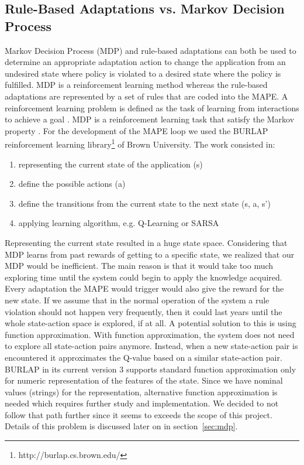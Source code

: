 \documentclass{seal_thesis}
\begin{document}
\subsection{Rule-Based Adaptations vs. Markov Decision Process}

Markov Decision Process (MDP) and rule-based adaptations can both be used to determine an appropriate adaptation action to change the application from an undesired state where policy is violated to a desired state where the policy is fulfilled.
MDP is a reinforcement learning method whereas the rule-based adaptations are represented by a set of rules that are coded into the MAPE.
A reinforcement learning problem is defined as the task of learning from interactions to achieve a goal \cite{sutton1998reinforcement}.
MDP is a reinforcement learning task that satisfy the Markov property \cite{sutton1998reinforcement}.
For the development of the MAPE loop we used the BURLAP reinforcement learning library\footnote{http://burlap.cs.brown.edu/} of Brown University. The work consisted in:
\begin{enumerate}
	\item representing the current state of the application (s)
	\item define the possible actions (a)
	\item define the transitions from the current state to the next state (s, a, s')
	\item applying learning algorithm, e.g. Q-Learning or SARSA
\end{enumerate}
Representing the current state resulted in a huge state space.
Considering that MDP learns from past rewards of getting to a specific state, we realized that our MDP would be inefficient.
The main reason is that it would take too much exploring time until the system could begin to apply the knowledge acquired.
Every adaptation the MAPE would trigger would also give the reward for the new state.
If we assume that in the normal operation of the system a rule violation should not happen very frequently, then it could last years until the whole state-action space is explored, if at all.
A potential solution to this is using function approximation.
With function approximation, the system does not need to explore all state-action pairs anymore.
Instead, when a new state-action pair is encountered it approximates the Q-value based on a similar state-action pair.
BURLAP in its current version 3 supports standard function approximation only for numeric representation of the features of the state.
Since we have nominal values (strings) for the representation, alternative function approximation is needed which requires further study and implementation.
We decided to not follow that path further since it seems to exceeds the scope of this project.
Details of this problem is discussed later on in section~\ref{sec:mdp}.
\end{document}
